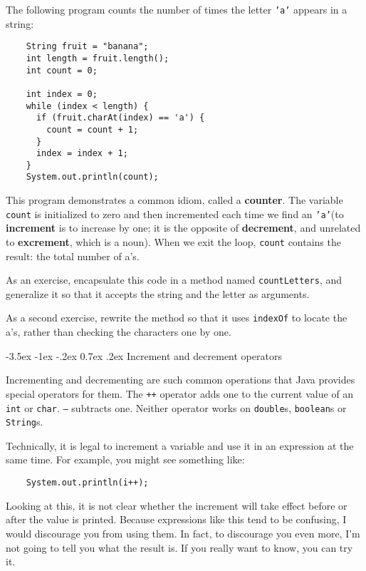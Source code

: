 \documentclass{book}
\makeatletter
\renewcommand{\section}{\@startsection 
    {section} {1} {0mm}%
    {-3.5ex \@plus -1ex \@minus -.2ex}%
    {0.7ex \@plus.2ex}%
    {\normalfont\Large\bfseries}}
\makeatother
\begin{document}
The following program counts the
number of times the letter {\tt 'a'} appears in a string:

\begin{verbatim}
    String fruit = "banana";
    int length = fruit.length();
    int count = 0;

    int index = 0;
    while (index < length) {
      if (fruit.charAt(index) == 'a') {
        count = count + 1;
      }
      index = index + 1;
    }
    System.out.println(count);
\end{verbatim}
%
This program demonstrates a common idiom, called a {\bf counter}.  The
variable {\tt count} is initialized to zero and then incremented each
time we find an {\tt 'a'}(to {\bf increment} is to increase by one;
it is the opposite of {\bf decrement}, and unrelated to {\bf
excrement}, which is a noun).  When we exit the loop, {\tt count}
contains the result: the total number of a's.


As an exercise, encapsulate this code in a method named
{\tt countLetters}, and generalize it so that it accepts the
string and the letter as arguments.


As a second exercise, rewrite the method so that it uses
{\tt indexOf} to locate the a's, rather than checking
the characters one by one.

\section{Increment and decrement operators}

Incrementing and decrementing are such common operations that
Java provides special operators for them.  The {\tt ++}
operator adds one to the current value of an {\tt int} or
{\tt char}.  {\tt --} subtracts one.  Neither operator works
on {\tt double}s, {\tt boolean}s or {\tt String}s.

Technically, it is legal to increment a variable and use it
in an expression at the same time.  For example, you might see
something like:

\begin{verbatim}
    System.out.println(i++);
\end{verbatim}
%
Looking at this, it is not clear whether the increment will
take effect before or after the value is printed.  Because
expressions like this tend to be confusing, I would discourage
you from using them.  In fact, to discourage you even more,
I'm not going to tell you what the result is.  If you really
want to know, you can try it.
\end{document}
